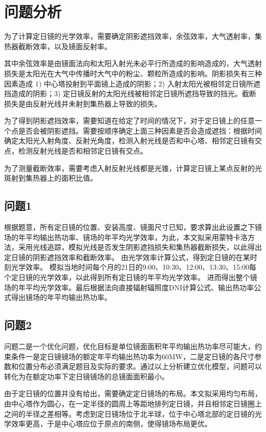 \section{问题分析}
为了计算定日镜的光学效率，需要确定阴影遮挡效率，余弦效率，大气透射率，集热器截断效率，以及镜面反射率。

其中余弦效率是由镜面法向和太阳入射光未必平行所造成的影响造成的，大气透射损失是太阳光在大气中传播时大气中的粉尘、颗粒所造成的影响。阴影损失有三种因素造成 1) 中心塔投射到平面镜上造成的阴影；2) 入射太阳光被相邻定日镜所遮挡造成的阴影；3) 定日镜反射的太阳光线被相邻定日镜所遮挡导致的挡光。截断损失是由反射光线并未射到集热器上导致的损失。

为了得到阴影遮挡效率，需要知道在给定了时间的情况下，对于定日镜上的任意一个点是否会被阴影遮挡。需要按顺序确定上面三种因素是否会造成遮挡：根据时间确定太阳光入射角度、反射光角度，检测入射光线是否和中心塔、相邻定日镜有交点，检测反射光线是否和相邻定日镜有交点。

为了测量截断效率，需要考虑入射反射光线都是光锥，计算定日镜上某点反射的光斑射到集热器上的面积比值。
\subsection{问题1}
根据题意，所有定日镜的位置、安装高度、镜面尺寸已知，要求算出此设置之下镜场的年平均输出热功率、镜场的年平均光学效率，为此，本文拟采用蒙特卡洛方法，采用光线追踪，模拟光线是否发生阴影遮挡损失和集热器截断损失，以此得出定日镜的阴影遮挡效率和截断效率。
由光学效率计算公式，得到定日镜的在某时刻光学效率。
模拟当地时间每个月的21日的9:00、10:30、12:00、13:30、15:00每个定日镜的光学效率，以此得到所有定日镜的年平均光学效率。
进而得出整个镜场的年平均光学效率。最后根据法向直接辐射辐照度DNI计算公式、输出热功率公式得出镜场的年平均输出热功率。
\subsection{问题2}
问题二是一个优化问题，优化目标是单位镜面面积年平均输出热功率尽可能大，约束条件一是定日镜镜场的额定年平均输出热功率为60MW，二是定日镜的各尺寸参数和位置分布必须满足题目及实际的要求。通过以上分析建立优化模型，问题可以转化为在额定功率下定日镜镜场的总镜面面积最小。

由于定日镜的位置并没有给出，需要确定定日镜场的布局。本文拟采用均匀布局，由中心塔作为圆心，在一定半径的圆周上等距地排列定日镜，并且相邻定日镜圈上之间的半径之差相等。考虑到定日镜场位于北半球，位于中心塔北部的定日镜的光学效率更高，于是中心塔应位于原点的南侧，使得镜场布局更优。

